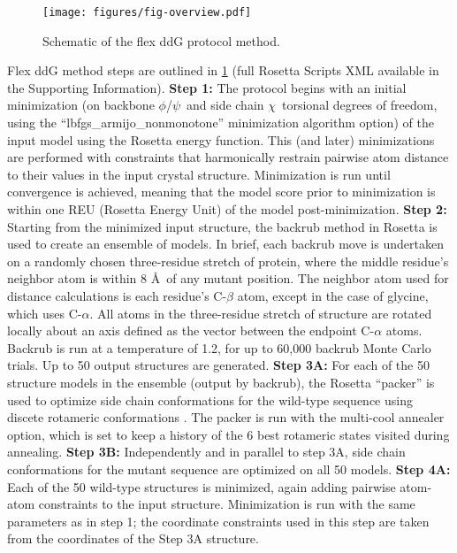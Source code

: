 \begin{figure}
  \centering
  \texttt{[image: figures/fig-overview.pdf]}
    \caption[]{
      Schematic of the flex ddG protocol method.
  } \label{fig:figure-overview}
\end{figure}

Flex ddG method steps are outlined in \cref{fig:figure-overview} (full Rosetta Scripts XML available in the Supporting Information).
\textbf{Step 1:} The protocol begins with an initial minimization (on backbone $\phi$/$\psi$\ and side chain $\chi$\ torsional degrees of freedom, using the ``lbfgs\_armijo\_nonmonotone'' minimization algorithm option) of the input model using the Rosetta energy function. This (and later) minimizations are performed with constraints that harmonically restrain pairwise atom distance to their values in the input crystal structure. Minimization is run until convergence is achieved, meaning that the model score prior to minimization is within one REU (Rosetta Energy Unit) of the model post-minimization.
\textbf{Step 2:} Starting from the minimized input structure, the backrub method in Rosetta is used to create an ensemble of models. In brief, each backrub move is undertaken on a randomly chosen three-residue stretch of protein, where the middle residue's neighbor atom is within 8 \AA\ of any mutant position. The neighbor atom used for distance calculations is each residue's C-$\beta$ atom, except in the case of glycine, which uses C-$\alpha$. All atoms in the three-residue stretch of structure are rotated locally about an axis defined as the vector between the endpoint C-$\alpha$ atoms. Backrub is run at a temperature of 1.2, for up to 60,000 backrub Monte Carlo trials. Up to 50 output structures are generated.
\textbf{Step 3A:} For each of the 50 structure models in the ensemble (output by backrub), the Rosetta ``packer'' is used to optimize side chain conformations for the wild-type sequence using discete rotameric conformations \cite{shapovalov_smoothed_2011}. The packer is run with the multi-cool annealer option\cite{leaver-fay_generic_2011}, which is set to keep a history of the 6 best rotameric states visited during annealing.
\textbf{Step 3B:} Independently and in parallel to step 3A, side chain conformations for the mutant sequence are optimized on all 50 models.
\textbf{Step 4A:} Each of the 50 wild-type structures is minimized, again adding pairwise atom-atom constraints to the input structure. Minimization is run with the same parameters as in step 1; the coordinate constraints used in this step are taken from the coordinates of the Step 3A structure.
